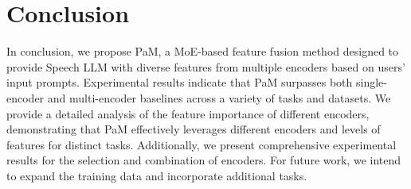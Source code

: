 \section{Conclusion}

In conclusion, we propose PaM, a MoE-based feature fusion method designed to provide Speech LLM with diverse features from multiple encoders based on users' input prompts. Experimental results indicate that PaM surpasses both single-encoder and multi-encoder baselines across a variety of tasks and datasets. We provide a detailed analysis of the feature importance of different encoders, demonstrating that PaM effectively leverages different encoders and levels of features for distinct tasks. Additionally, we present comprehensive experimental results for the selection and combination of encoders. For future work, we intend to expand the training data and incorporate additional tasks.